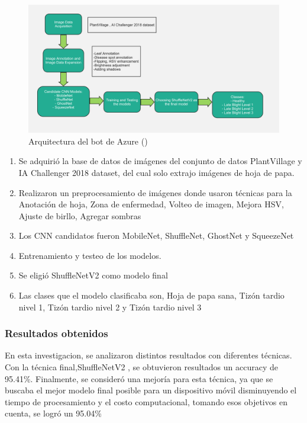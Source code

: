 \begin{figure}[H]
	\begin{center}
		\includegraphics[width=1\textwidth]{2/figures/ant2.2.jpg}
		\caption{Arquitectura del bot de Azure (\cite{antecedente2})}
	\end{center}
\end{figure}
\begin{enumerate}
	\item Se adquirió la base de datos de imágenes del conjunto de datos PlantVillage y IA Challenger 2018 dataset, del cual solo extrajo imágenes de hoja de papa.
	\item Realizaron un preprocesamiento de imágenes donde usaron técnicas para la Anotación de hoja, Zona de enfermedad, Volteo de imagen, Mejora HSV, Ajuste de birllo, Agregar sombras
	\item Los CNN candidatos fueron  MobileNet, ShuffleNet, GhostNet y SqueezeNet
	\item Entrenamiento y testeo de los modelos.
	\item Se eligió ShuffleNetV2 como modelo final
	\item Las clases que el modelo clasificaba son, Hoja de papa sana, Tizón tardio nivel 1, Tizón tardio nivel 2 y Tizón tardio nivel 3
\end{enumerate}

\subsubsection{Resultados obtenidos}
En esta investigacion, se analizaron distintos resultados con diferentes técnicas. Con la técnica final,ShuffleNetV2 , se obtuvieron resultados un accuracy de 95.41\%. Finalmente, se consideró una mejoría para esta técnica, ya que se buscaba el mejor modelo final posible para un dispositivo móvil disminuyendo el tiempo de procesamiento y el costo computacional, tomando esos objetivos en cuenta, se logró un 95.04\%

